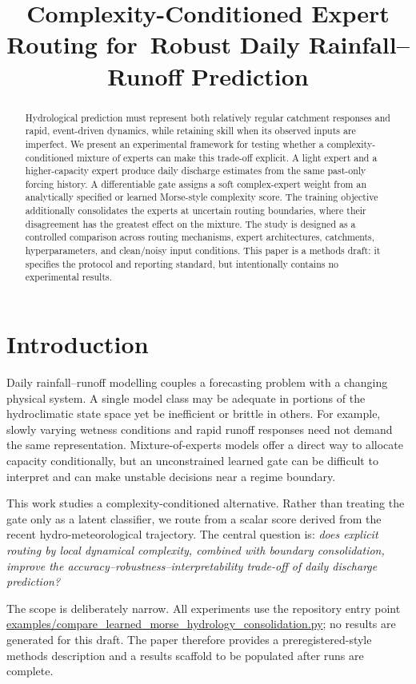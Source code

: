 \documentclass[11pt]{article}
\title{Complexity-Conditioned Expert Routing for\
Robust Daily Rainfall--Runoff Prediction}
\author{\TODO{Author names and affiliations}}
\date{\TODO{Draft date}}
\begin{document}
\maketitle

\begin{abstract}
Hydrological prediction must represent both relatively regular catchment responses and rapid, event-driven dynamics, while retaining skill when its observed inputs are imperfect. We present an experimental framework for testing whether a complexity-conditioned mixture of experts can make this trade-off explicit. A light expert and a higher-capacity expert produce daily discharge estimates from the same past-only forcing history. A differentiable gate assigns a soft complex-expert weight from an analytically specified or learned Morse-style complexity score. The training objective additionally consolidates the experts at uncertain routing boundaries, where their disagreement has the greatest effect on the mixture. The study is designed as a controlled comparison across routing mechanisms, expert architectures, catchments, hyperparameters, and clean/noisy input conditions. This paper is a methods draft: it specifies the protocol and reporting standard, but intentionally contains no experimental results.
\end{abstract}

\section{Introduction}
Daily rainfall--runoff modelling couples a forecasting problem with a changing physical system. A single model class may be adequate in portions of the hydroclimatic state space yet be inefficient or brittle in others. For example, slowly varying wetness conditions and rapid runoff responses need not demand the same representation. Mixture-of-experts models offer a direct way to allocate capacity conditionally, but an unconstrained learned gate can be difficult to interpret and can make unstable decisions near a regime boundary.

This work studies a complexity-conditioned alternative. Rather than treating the gate only as a latent classifier, we route from a scalar score derived from the recent hydro-meteorological trajectory. The central question is: \emph{does explicit routing by local dynamical complexity, combined with boundary consolidation, improve the accuracy--robustness--interpretability trade-off of daily discharge prediction?}

The scope is deliberately narrow. All experiments use the repository entry point \url{examples/compare_learned_morse_hydrology_consolidation.py}; no results are generated for this draft. The paper therefore provides a preregistered-style methods description and a results scaffold to be populated after runs are complete.
\end{document}
